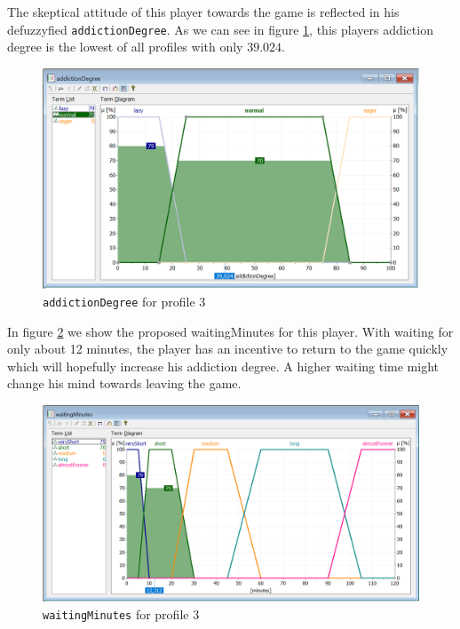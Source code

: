The skeptical attitude of this player towards the game is reflected in his defuzzyfied \texttt{addictionDegree}. As we can see in figure \ref{fig:p3ad}, this players addiction degree is the lowest of all profiles with only $39.024$.

\begin{figure}[H]
\centering
\includegraphics[width=\textwidth]{img/profile3_vAddictionDegree}
\caption{\texttt{addictionDegree} for profile 3}
\label{fig:p3ad} 
\end{figure}

In figure \ref{fig:p3wm} we show the proposed waitingMinutes for this player. With waiting for only about 12 minutes, the player has an incentive to return to the game quickly which will hopefully increase his addiction degree. A higher waiting time might change his mind towards leaving the game.

\begin{figure}[H]
\centering
\includegraphics[width=\textwidth]{img/profile3_vWaitingMinutes}
\caption{\texttt{waitingMinutes} for profile 3}
\label{fig:p3wm} 
\end{figure}

